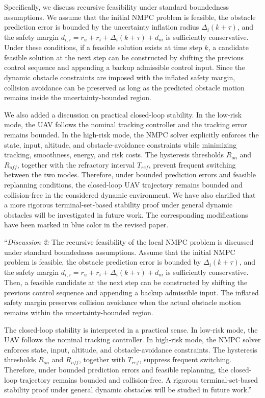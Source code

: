 \documentclass[12pt, twosides]{article}
\theoremstyle{definition}
\begin{document}
Specifically, we discuss recursive feasibility under standard boundedness assumptions. We assume that the initial NMPC problem is feasible, the obstacle prediction error is bounded by the uncertainty inflation radius $\Delta_i(k+\tau)$, and the safety margin $d_{i,\tau}=r_u+r_i+\Delta_i(k+\tau)+d_m$ is sufficiently conservative. Under these conditions, if a feasible solution exists at time step $k$, a candidate feasible solution at the next step can be constructed by shifting the previous control sequence and appending a backup admissible control input. Since the dynamic obstacle constraints are imposed with the inflated safety margin, collision avoidance can be preserved as long as the predicted obstacle motion remains inside the uncertainty-bounded region.

We also added a discussion on practical closed-loop stability. In the low-risk mode, the UAV follows the nominal tracking controller and the tracking error remains bounded. In the high-risk mode, the NMPC solver explicitly enforces the state, input, altitude, and obstacle-avoidance constraints while minimizing tracking, smoothness, energy, and risk costs. The hysteresis thresholds $R_{on}$ and $R_{off}$, together with the refractory interval $T_{ref}$, prevent frequent switching between the two modes. Therefore, under bounded prediction errors and feasible replanning conditions, the closed-loop UAV trajectory remains bounded and collision-free in the considered dynamic environment. We have also clarified that a more rigorous terminal-set-based stability proof under general dynamic obstacles will be investigated in future work. The corresponding modifications have been marked in blue color in the revised paper.

``\textit{Discussion 2:}
The recursive feasibility of the local NMPC problem is discussed under standard boundedness assumptions. Assume that the initial NMPC problem is feasible, the obstacle prediction error is bounded by $\Delta_i(k+\tau)$, and the safety margin $d_{i,\tau}=r_u+r_i+\Delta_i(k+\tau)+d_m$ is sufficiently conservative. Then, a feasible candidate at the next step can be constructed by shifting the previous control sequence and appending a backup admissible input. The inflated safety margin preserves collision avoidance when the actual obstacle motion remains within the uncertainty-bounded region.

The closed-loop stability is interpreted in a practical sense. In low-risk mode, the UAV follows the nominal tracking controller. In high-risk mode, the NMPC solver enforces state, input, altitude, and obstacle-avoidance constraints. The hysteresis thresholds $R_{on}$ and $R_{off}$, together with $T_{ref}$, suppress frequent switching. Therefore, under bounded prediction errors and feasible replanning, the closed-loop trajectory remains bounded and collision-free. A rigorous terminal-set-based stability proof under general dynamic obstacles will be studied in future work.''
\end{document}
